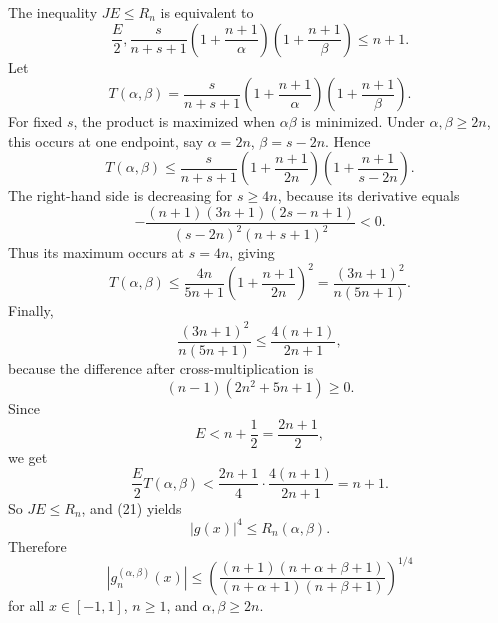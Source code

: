 \documentclass[11pt]{article}
\begin{document}
The inequality \(JE\le R_n\) is equivalent to
\begin{equation}
\frac{E}{2},
\frac{s}{n+s+1}
\left(1+\frac{n+1}{\alpha}\right)
\left(1+\frac{n+1}{\beta}\right)
\le n+1.
\tag{22}
\end{equation}
Let
\begin{equation*}
T(\alpha,\beta)
=
\frac{s}{n+s+1}
\left(1+\frac{n+1}{\alpha}\right)
\left(1+\frac{n+1}{\beta}\right).
\end{equation*}
For fixed \(s\), the product is maximized when \(\alpha\beta\) is minimized. Under \(\alpha,\beta\ge2n\), this occurs at one endpoint, say \(\alpha=2n\), \(\beta=s-2n\). Hence
\begin{equation*}
T(\alpha,\beta)
\le
\frac{s}{n+s+1}
\left(1+\frac{n+1}{2n}\right)
\left(1+\frac{n+1}{s-2n}\right).
\end{equation*}
The right-hand side is decreasing for \(s\ge4n\), because its derivative equals
\begin{equation*}
-\frac{(n+1)(3n+1)(2s-n+1)}
{(s-2n)^2(n+s+1)^2}<0.
\end{equation*}
Thus its maximum occurs at \(s=4n\), giving
\begin{equation*}
T(\alpha,\beta)
\le
\frac{4n}{5n+1}
\left(1+\frac{n+1}{2n}\right)^2
=
\frac{(3n+1)^2}{n(5n+1)}.
\end{equation*}
Finally,
\begin{equation*}
\frac{(3n+1)^2}{n(5n+1)}
\le
\frac{4(n+1)}{2n+1},
\end{equation*}
because the difference after cross-multiplication is
\begin{equation*}
(n-1)(2n^2+5n+1)\ge0.
\end{equation*}
Since
\begin{equation*}
E<n+\frac12=\frac{2n+1}{2},
\end{equation*}
we get
\begin{equation*}
\frac{E}{2}T(\alpha,\beta)
<
\frac{2n+1}{4}\cdot
\frac{4(n+1)}{2n+1}
=
n+1.
\end{equation*}
So \(JE\le R_n\), and (21) yields
\begin{equation*}
|g(x)|^4\le R_n(\alpha,\beta).
\end{equation*}
Therefore
\begin{equation*}
\boxed{
|g_n^{(\alpha,\beta)}(x)|
\le
\left(
\frac{(n+1)(n+\alpha+\beta+1)}
{(n+\alpha+1)(n+\beta+1)}
\right)^{1/4}
}
\end{equation*}
for all \(x\in[-1,1]\), \(n\ge1\), and \(\alpha,\beta\ge2n\).
\end{document}
